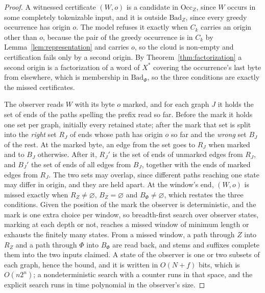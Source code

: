 \documentclass[11pt,a4paper]{article}
\theoremstyle{definition}
\theoremstyle{plain}
\begin{document}
\begin{proof}
A witnessed certificate $(W, o)$ is a candidate in $\mathrm{Occ}_Z$, since $W$ occurs in some completely tokenizable
input, and it is outside $\mathrm{Bad}_Z$, since every greedy occurrence has origin $o$. The model refuses it exactly
when $C_k$ carries an origin other than $o$, because the pair of the greedy occurrence is in $C_k$ by
Lemma~\ref{lem:representation} and carries $o$, so the cloud is non-empty and certification fails only by a second
origin. By Theorem~\ref{thm:factorization} a second origin is a factorization of a word of $X^*$ covering the
occurrence's last byte from elsewhere, which is membership in $\mathrm{Bad}_\Phi$, so the three conditions are exactly
the missed certificates.

The observer reads $W$ with its byte $o$ marked, and for each graph $J$ it holds the set of ends of the paths spelling
the prefix read so far. Before the mark it holds one set per graph, initially every retained state; after the mark that
set is split into the \emph{right} set $R_J$ of ends whose path has origin $o$ so far and the \emph{wrong} set $B_J$ of
the rest. At the marked byte, an edge from the set goes to $R_J$ when marked and to $B_J$ otherwise. After it, $R_J'$ is
the set of ends of unmarked edges from $R_J$, and $B_J'$ the set of ends of all edges from $B_J$, together with the ends
of marked edges from $R_J$. The two sets may overlap, since different paths reaching one state may differ in origin, and
they are held apart. At the window's end, $(W, o)$ is missed exactly when $R_Z \neq \varnothing$, $B_Z = \varnothing$
and $B_\Phi \neq \varnothing$, which restates the three conditions. Given the position of the mark the observer is
deterministic, and the mark is one extra choice per window, so breadth-first search over observer states, marking at
each depth or not, reaches a missed window of minimum length or exhausts the finitely many states. From a missed window,
a path through $Z$ into $R_Z$ and a path through $\Phi$ into $B_\Phi$ are read back, and stems and suffixes complete
them into the two inputs claimed. A state of the observer is one or two subsets of each graph, hence the bound, and it
is written in $O(N + f)$ bits, which is $O(n 2^n)$; a nondeterministic search with a counter runs in that space, and the
explicit search runs in time polynomial in the observer's size.
\end{proof}
\end{document}
